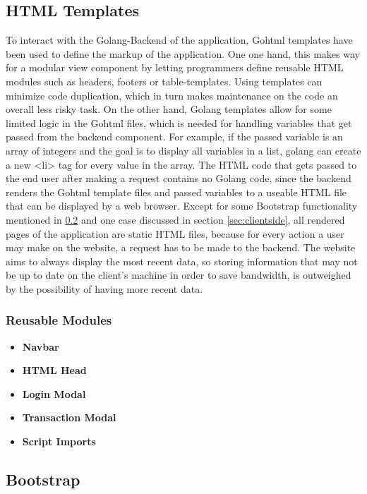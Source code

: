 \subsection{HTML Templates}
To interact with the Golang-Backend of the application, Gohtml templates have been used to define the markup of the application. One one hand, this makes way for a modular view component by letting programmers define reusable HTML modules such as headers, footers or table-templates. Using templates can minimize code duplication, which in turn makes maintenance on the code an overall less risky task. On the other hand, Golang templates allow for some limited logic in the Gohtml files, which is needed for handling variables that get passed from the backend component. For example, if the passed variable is an array of integers and the goal is to display all variables in a list, golang can create a new <li> tag for every value in the array. The HTML code that gets passed to the end user after making a request contains no Golang code, since the backend renders the Gohtml template files and passed variables to a useable HTML file that can be displayed by a web browser. Except for some Bootstrap functionality mentioned in \ref{sec:uiframeworks} and one case discussed in section \ref{sec:clientside}, all rendered pages of the application are static HTML files, because for every action a user may make on the website, a request has to be made to the backend. The website aims to always display the most recent data, so storing information that may not be up to date on the client's machine in order to save bandwidth, is outweighed by the possibility of having more recent data. 

\subsubsection{Reusable Modules}
\begin{itemize}
\item \textbf{Navbar}
\item \textbf{HTML Head}
\item \textbf{Login Modal}
\item \textbf{Transaction Modal}
\item \textbf{Script Imports}
\end{itemize}

\subsection{Bootstrap} \label{sec:uiframeworks}

